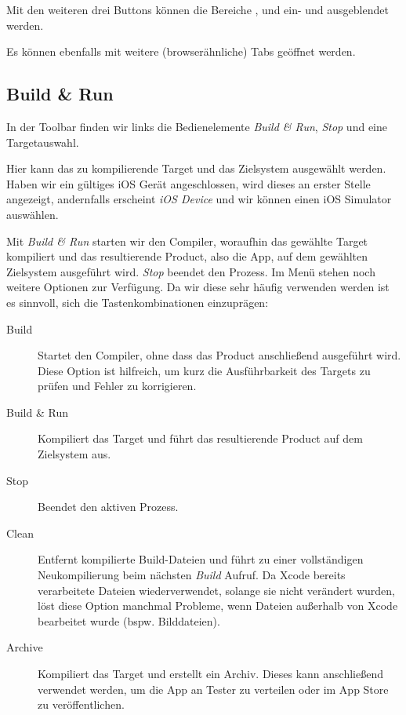\documentclass[parskip=half, final]{scrreprt}
\begin{document}
Mit den weiteren drei Buttons können die Bereiche ,  und  ein- und ausgeblendet werden.

Es können ebenfalls mit  weitere (browserähnliche) Tabs geöffnet werden.

\subsection{Build \& Run}\label{sec:buildandrun}

In der Toolbar finden wir links die Bedienelemente \emph{Build \& Run}, \emph{Stop} und eine Targetauswahl.

Hier kann das zu kompilierende Target und das Zielsystem ausgewählt werden. Haben wir ein gültiges iOS Gerät angeschlossen, wird dieses an erster Stelle angezeigt, andernfalls erscheint \emph{iOS Device} und wir können einen iOS Simulator auswählen.

Mit \emph{Build \& Run} starten wir den Compiler, woraufhin das gewählte Target kompiliert und das resultierende Product, also die App, auf dem gewählten Zielsystem ausgeführt wird. \emph{Stop} beendet den Prozess. Im Menü  stehen noch weitere Optionen zur Verfügung. Da wir diese sehr häufig verwenden werden ist es sinnvoll, sich die Tastenkombinationen einzuprägen:
\begin{description}
\item[Build]  Startet den Compiler, ohne dass das Product anschließend ausgeführt wird. Diese Option ist hilfreich, um kurz die Ausführbarkeit des Targets zu prüfen und Fehler zu korrigieren.
\item[Build \& Run]  Kompiliert das Target und führt das resultierende Product auf dem Zielsystem aus.
\item[Stop]  Beendet den aktiven Prozess.
\item[Clean]  Entfernt kompilierte Build-Dateien und führt zu einer vollständigen Neukompilierung beim nächsten \emph{Build} Aufruf. Da Xcode bereits verarbeitete Dateien wiederverwendet, solange sie nicht verändert wurden, löst diese Option manchmal Probleme, wenn Dateien außerhalb von Xcode bearbeitet wurde (bspw. Bilddateien).
\item[Archive] Kompiliert das Target und erstellt ein Archiv. Dieses kann anschließend verwendet werden, um die App an Tester zu verteilen oder im App Store zu veröffentlichen.
\end{description}
\end{document}
